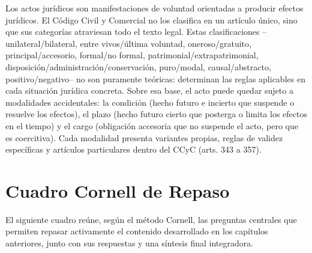 \documentclass[12pt,oneside]{book}
\begin{document}
Los actos jurídicos son manifestaciones de voluntad orientadas a producir efectos jurídicos. El Código Civil y Comercial no los clasifica en un artículo único, sino que sus categorías atraviesan todo el texto legal. Estas clasificaciones --unilateral/bilateral, entre vivos/última voluntad, oneroso/gratuito, principal/accesorio, formal/no formal, patrimonial/extrapatrimonial, disposición/administración/conservación, puro/modal, causal/abstracto, positivo/negativo-- no son puramente teóricas: determinan las reglas aplicables en cada situación jurídica concreta. Sobre esa base, el acto puede quedar sujeto a modalidades accidentales: la condición (hecho futuro e incierto que suspende o resuelve los efectos), el plazo (hecho futuro cierto que posterga o limita los efectos en el tiempo) y el cargo (obligación accesoria que no suspende el acto, pero que es coercitiva). Cada modalidad presenta variantes propias, reglas de validez específicas y artículos particulares dentro del CCyC (arts. 343 a 357).


\section{Cuadro Cornell de Repaso}

El siguiente cuadro reúne, según el método Cornell, las preguntas centrales que permiten repasar activamente el contenido desarrollado en los capítulos anteriores, junto con sus respuestas y una síntesis final integradora.
\end{document}
